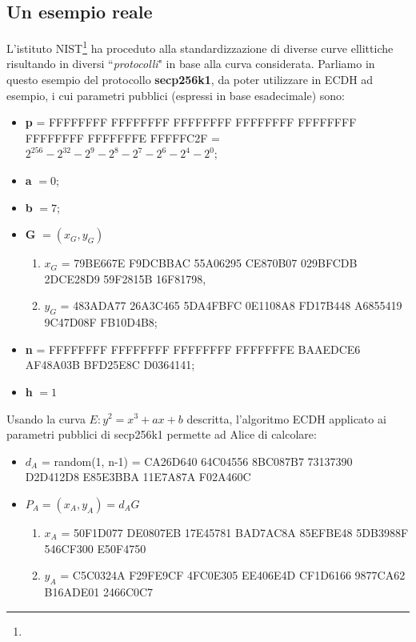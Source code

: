 \documentclass[a4paper,12pt]{tesiinfo}
\renewcommand{\footnotesize}{\fontsize{9pt}{11pt}\selectfont}
\begin{document}
\subsection{Un esempio reale}
L'istituto NIST\footnote{\footnotesize{National Institute of Standards and Technology}} ha proceduto alla standardizzazione di diverse curve ellittiche risultando in diversi ``\textit{protocolli}" in base alla curva considerata. Parliamo in questo esempio del protocollo \textbf{secp256k1}, da poter utilizzare in ECDH ad esempio, i cui parametri pubblici (espressi in base esadecimale) sono:
\begin{itemize}
 \item \textbf{p} = FFFFFFFF FFFFFFFF FFFFFFFF FFFFFFFF FFFFFFFF FFFFFFFF FFFFFFFE FFFFFC2F = $2^{256} - 2^{32}-2^9-2^8-2^7-2^6-2^4-2^0$;
 
 \item \textbf{a} $=0$;
 
 \item \textbf{b} $=7$;
 
 \item \textbf{G} $= (x_G, y_G)$
\begin{enumerate}
\item $x_G$ = 79BE667E F9DCBBAC 55A06295 CE870B07 029BFCDB 2DCE28D9 59F2815B 16F81798,
 \item $y_G$ = 483ADA77 26A3C465 5DA4FBFC 0E1108A8 FD17B448 A6855419 9C47D08F FB10D4B8;
 \end{enumerate}
 \item \textbf{n} = FFFFFFFF FFFFFFFF FFFFFFFF FFFFFFFE BAAEDCE6 AF48A03B BFD25E8C D0364141;
 
 \item \textbf{h} $ = 1$
\end{itemize}
Usando la curva $E : y^2 = x^3+ax+b$ descritta, l'algoritmo ECDH applicato ai parametri pubblici di secp256k1 permette ad Alice di calcolare:
\begin{itemize}

\item $d_A$ = random(1, n-1) = CA26D640 64C04556 8BC087B7 73137390 D2D412D8 E85E3BBA 11E7A87A F02A460C

\item $P_A = (x_A, y_A) = d_AG$
\begin{enumerate}

\item $x_A$ = 50F1D077 DE0807EB 17E45781 BAD7AC8A 85EFBE48 5DB3988F 546CF300 E50F4750

\item $y_A$ = C5C0324A F29FE9CF 4FC0E305 EE406E4D CF1D6166 9877CA62 B16ADE01 2466C0C7
\end{enumerate}
\end{itemize}
\end{document}
